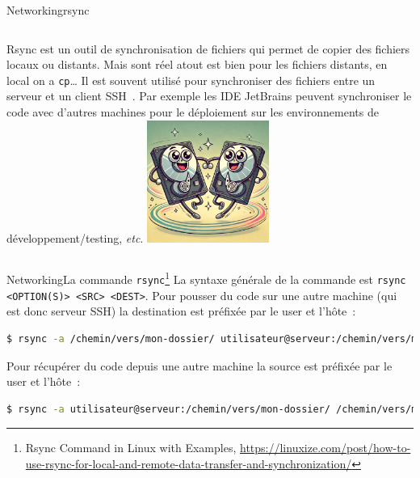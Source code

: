 \documentclass{beamer}
\begin{document}
    \begin{frame}{Networking}{rsync}
        \begin{columns}
            Rsync est un outil de synchronisation de fichiers qui permet de copier des fichiers locaux ou distants.
            Mais sont réel atout est bien pour les fichiers distants, en local on a \lstinline{cp}\ldots
            \bigbreak
            Il est souvent utilisé pour synchroniser des fichiers entre un serveur et un client SSH~.
            \bigbreak
            Par exemple les IDE JetBrains peuvent synchroniser le code avec d'autres machines pour le déploiement sur les environnements de développement/testing, \textit{etc}.
            \centering
            \includegraphics[width=4cm]{image/hdd-synchronous}
        \end{columns}
    \end{frame}

    \begin{frame}[fragile]{Networking}{La commande \lstinline{rsync}\footnote{Rsync Command in Linux with Examples, \url{https://linuxize.com/post/how-to-use-rsync-for-local-and-remote-data-transfer-and-synchronization/}}}
        La syntaxe générale de la commande est \lstinline{rsync <OPTION(S)> <SRC> <DEST>}.
        Pour pousser du code sur une autre machine (qui est donc serveur SSH) la destination est préfixée par le user et l'hôte~:
        \bigbreak
        \begin{lstlisting}[language=bash]
$ rsync -a /chemin/vers/mon-dossier/ utilisateur@serveur:/chemin/vers/mon-dossier/
        \end{lstlisting}
        Pour récupérer du code depuis une autre machine la source est préfixée par le user et l'hôte~:
        \begin{lstlisting}[language=bash]
$ rsync -a utilisateur@serveur:/chemin/vers/mon-dossier/ /chemin/vers/mon-dossier/
        \end{lstlisting}
    \end{frame}
\end{document}
